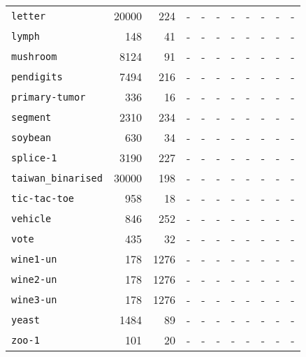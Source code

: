 \begin{tabular}{lccrrrrrrrr}
\texttt{letter} & \multicolumn{1}{r}{20000} & \multicolumn{1}{r}{224}  & - & - & - & - & - & - & - & -\\
\texttt{lymph} & \multicolumn{1}{r}{148} & \multicolumn{1}{r}{41}  & - & - & - & - & - & - & - & -\\
\texttt{mushroom} & \multicolumn{1}{r}{8124} & \multicolumn{1}{r}{91}  & - & - & - & - & - & - & - & -\\
\texttt{pendigits} & \multicolumn{1}{r}{7494} & \multicolumn{1}{r}{216}  & - & - & - & - & - & - & - & -\\
\texttt{primary-tumor} & \multicolumn{1}{r}{336} & \multicolumn{1}{r}{16}  & - & - & - & - & - & - & - & -\\
\texttt{segment} & \multicolumn{1}{r}{2310} & \multicolumn{1}{r}{234}  & - & - & - & - & - & - & - & -\\
\texttt{soybean} & \multicolumn{1}{r}{630} & \multicolumn{1}{r}{34}  & - & - & - & - & - & - & - & -\\
\texttt{splice-1} & \multicolumn{1}{r}{3190} & \multicolumn{1}{r}{227}  & - & - & - & - & - & - & - & -\\
\texttt{taiwan\_binarised} & \multicolumn{1}{r}{30000} & \multicolumn{1}{r}{198}  & - & - & - & - & - & - & - & -\\
\texttt{tic-tac-toe} & \multicolumn{1}{r}{958} & \multicolumn{1}{r}{18}  & - & - & - & - & - & - & - & -\\
\texttt{vehicle} & \multicolumn{1}{r}{846} & \multicolumn{1}{r}{252}  & - & - & - & - & - & - & - & -\\
\texttt{vote} & \multicolumn{1}{r}{435} & \multicolumn{1}{r}{32}  & - & - & - & - & - & - & - & -\\
\texttt{wine1-un} & \multicolumn{1}{r}{178} & \multicolumn{1}{r}{1276}  & - & - & - & - & - & - & - & -\\
\texttt{wine2-un} & \multicolumn{1}{r}{178} & \multicolumn{1}{r}{1276}  & - & - & - & - & - & - & - & -\\
\texttt{wine3-un} & \multicolumn{1}{r}{178} & \multicolumn{1}{r}{1276}  & - & - & - & - & - & - & - & -\\
\texttt{yeast} & \multicolumn{1}{r}{1484} & \multicolumn{1}{r}{89}  & - & - & - & - & - & - & - & -\\
\texttt{zoo-1} & \multicolumn{1}{r}{101} & \multicolumn{1}{r}{20}  & - & - & - & - & - & - & - & -\\
\bottomrule
\end{tabular}
